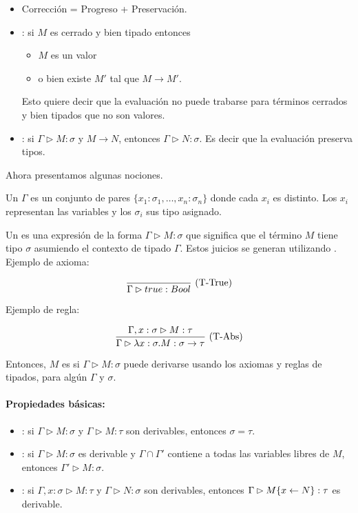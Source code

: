 \begin{itemize}
  \item Corrección = Progreso + Preservación.
  \item {}: si $M$ es cerrado y bien tipado entonces
    \begin{itemize}
      \item $M$ es un valor
      \item o bien existe $M'$ tal que $M \to M'$.
    \end{itemize}
    Esto quiere decir que la evaluación no puede trabarse para términos cerrados y bien tipados que no son valores.
  \item {}: si $\Gamma \rhd M : \sigma$ y $M \to N$, entonces $\Gamma \rhd N : \sigma$. Es decir que la evaluación preserva tipos.
\end{itemize}

Ahora presentamos algunas nociones.

Un  $\Gamma$ es un conjunto de pares $\{x_1:\sigma_1,\dots,x_n:\sigma_n\}$ donde cada $x_i$ es distinto. Los $x_i$ representan las variables y los $\sigma_i$ sus tipo asignado.

Un  es una expresión de la forma $\Gamma \rhd M : \sigma$ que significa que el término $M$ tiene tipo $\sigma$ asumiendo el contexto de tipado $\Gamma$. Estos juicios se generan utilizando . Ejemplo de axioma:

\[\frac{}{\Gamma \rhd true : Bool}\ \text{(T-True)}\]

Ejemplo de regla:

\[\frac{\Gamma, x : \sigma \rhd M : \tau}{\Gamma \rhd \lambda x:\sigma.M:\sigma\to\tau}\ \text{(T-Abs)}\]

\vspace{0.5em}
Entonces, $M$ es   si $\Gamma \rhd M : \sigma$ puede derivarse usando los axiomas y reglas de tipados, para algún $\Gamma$ y $\sigma$.

\paragraph{Propiedades básicas:}

\begin{itemize}
  \item {}: si $\Gamma \rhd M : \sigma$ y $\Gamma \rhd M : \tau$ son derivables, entonces $\sigma = \tau$.
  \item {}: si $\Gamma \rhd M : \sigma$ es derivable y $\Gamma \cap \Gamma'$ contiene a todas las variables libres de $M$, entonces $\Gamma' \rhd M : \sigma$.
  \item {}: si $\Gamma,x:\sigma \rhd M : \tau$ y $\Gamma \rhd N : \sigma$ son derivables, entonces $\Gamma \rhd M\{x\leftarrow N\} : \tau$ es derivable.
\end{itemize}

